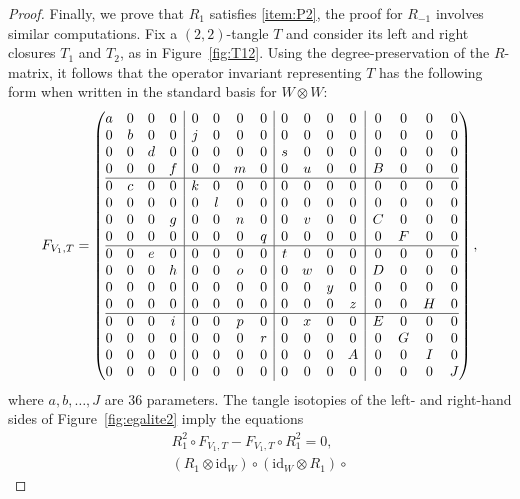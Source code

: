 \documentclass[10pt,a4paper]{amsart}
\numberwithin{equation}{section}
\theoremstyle{definition}
\begin{document}
\begin{proof}
Finally, we prove that $R_{1}$ satisfies \eqref{item:P2}, the proof for $R_{-1}$
involves similar computations. Fix a $(2,2)$-tangle $T$ and consider its
left and right closures $T_1$ and $T_2$, as in
Figure~\ref{fig:T12}. Using the degree-preservation of the $R$-matrix, it
follows that the operator invariant representing $T$
has the following form when written in the standard basis for $W \otimes W$:
\[
F_{V_1,T}=\left(\begin{array}{@{}cccc|cccc|cccc|cccc@{}}
a & 0 & 0 & 0 & 0 & 0 & 0 & 0 & 0 & 0 & 0 & 0 & 0 & 0 & 0 & 0 \\
0 & b & 0 & 0 & j & 0 & 0 & 0 & 0 & 0 & 0 & 0 & 0 & 0 & 0 & 0 \\
0 & 0 & d & 0 & 0 & 0 & 0 & 0 & s & 0 & 0 & 0 & 0 & 0 & 0 & 0 \\
0 & 0 & 0 & f & 0 & 0 & m & 0 & 0 & u & 0 & 0 & B & 0 & 0 & 0 \\\hline
0 & c & 0 & 0 & k & 0 & 0 & 0 & 0 & 0 & 0 & 0 & 0 & 0 & 0 & 0 \\
0 & 0 & 0 & 0 & 0 & l & 0 & 0 & 0 & 0 & 0 & 0 & 0 & 0 & 0 & 0 \\
0 & 0 & 0 & g & 0 & 0 & n & 0 & 0 & v & 0 & 0 & C & 0 & 0 & 0 \\
0 & 0 & 0 & 0 & 0 & 0 & 0 & q & 0 & 0 & 0 & 0 & 0 & F & 0 & 0 \\\hline
0 & 0 & e & 0 & 0 & 0 & 0 & 0 & t & 0 & 0 & 0 & 0 & 0 & 0 & 0 \\
0 & 0 & 0 & h & 0 & 0 & o & 0 & 0 & w & 0 & 0 & D & 0 & 0 & 0 \\
0 & 0 & 0 & 0 & 0 & 0 & 0 & 0 & 0 & 0 & y & 0 & 0 & 0 & 0 & 0 \\
0 & 0 & 0 & 0 & 0 & 0 & 0 & 0 & 0 & 0 & 0 & z & 0 & 0 & H & 0 \\\hline
0 & 0 & 0 & i & 0 & 0 & p & 0 & 0 & x & 0 & 0 & E & 0 & 0 & 0 \\
0 & 0 & 0 & 0 & 0 & 0 & 0 & r & 0 & 0 & 0 & 0 & 0 & G & 0 & 0 \\
0 & 0 & 0 & 0 & 0 & 0 & 0 & 0 & 0 & 0 & 0 & A & 0 & 0 & I & 0 \\
0 & 0 & 0 & 0 & 0 & 0 & 0 & 0 & 0 & 0 & 0 & 0 & 0 & 0 & 0 & J \\
 \end{array}\right),
\]
where $a, b, \dots, J$ are $36$ parameters. The tangle isotopies of
the left- and right-hand sides of Figure~\ref{fig:egalite2}
imply the equations
\begin{gather*}
 R_1^2 \circ F_{V_1,T} - F_{V_1,T} \circ R_1^2 = 0, \\
(R_1 \otimes \text{id}_W) \circ (\text{id}_W \otimes R_1) \circ

\end{gather*}
\end{proof}
\end{document}
